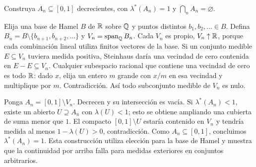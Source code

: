 \begin{ejercicio}\label{ej:v2-l06-9}
Construya $A_n\subseteq[0,1]$ decrecientes, con $\lambda^*(A_n)=1$ y $\bigcap_nA_n=\varnothing$.
\end{ejercicio}
\begin{solucion}
Elija una base de Hamel $B$ de $\mathbb R$ sobre $\mathbb Q$ y puntos distintos $b_1,b_2,\ldots\in B$. Defina $B_n=B\setminus\{b_{n+1},b_{n+2},\ldots\}$ y $V_n=\operatorname{span}_{\mathbb Q}B_n$. Cada $V_n$ es propio, $V_n\uparrow\mathbb R$, porque cada combinación lineal utiliza finitos vectores de la base. Si un conjunto medible $E\subseteq V_n$ tuviera medida positiva, Steinhaus daría una vecindad de cero contenida en $E-E\subseteq V_n$. Cualquier subespacio racional que contiene una vecindad de cero es todo $\mathbb R$: dado $x$, elija un entero $m$ grande con $x/m$ en esa vecindad y multiplique por $m$. Contradicción. Así todo subconjunto medible de $V_n$ es nulo.

Ponga $A_n=[0,1]\setminus V_n$. Decrecen y su intersección es vacía. Si $\lambda^*(A_n)<1$, existe un abierto $U\supseteq A_n$ con $\lambda(U)<1$; esto se obtiene ampliando una cubierta de suma menor que $1$. El compacto $[0,1]\setminus U$ estaría contenido en $V_n$ y tendría medida al menos $1-\lambda(U)>0$, contradicción. Como $A_n\subseteq[0,1]$, concluimos $\lambda^*(A_n)=1$. Esta construcción utiliza elección para la base de Hamel y muestra que la continuidad por arriba falla para medidas exteriores en conjuntos arbitrarios.
\end{solucion}

